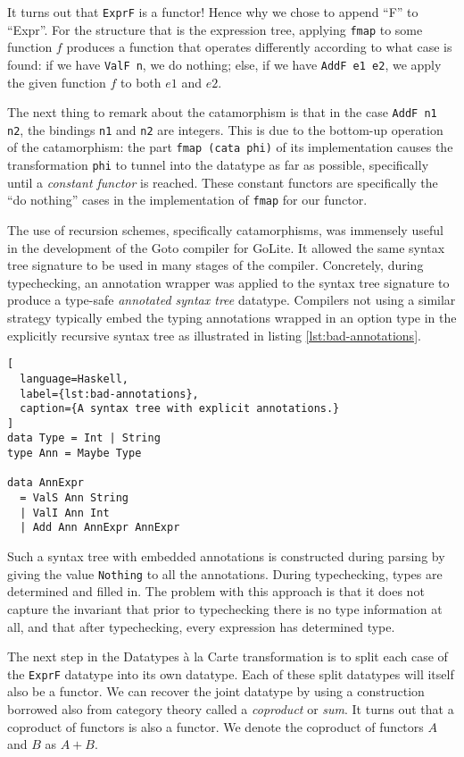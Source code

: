 \documentclass[letterpaper,11pt]{article}
\newcommand{\codesnip}{\texttt}
\begin{document}
It turns out that \codesnip{ExprF} is a functor! Hence why we chose to append
``F'' to ``Expr''. For the structure that is the expression tree, applying
\codesnip{fmap} to some function $f$ produces a function that operates
differently according to what case is found: if we have \codesnip{ValF n}, we
do nothing; else, if we have \codesnip{AddF e1 e2}, we apply the given function
$f$ to both $e1$ and $e2$.

The next thing to remark about the catamorphism is that in the case
\codesnip{AddF n1 n2}, the bindings \codesnip{n1} and \codesnip{n2} are
integers. This is due to the bottom-up operation of the catamorphism: the part
\codesnip{fmap (cata phi)} of its implementation causes the transformation
\codesnip{phi} to tunnel into the datatype as far as possible, specifically
until a \emph{constant functor} is reached. These constant functors are
specifically the ``do nothing'' cases in the implementation of \codesnip{fmap}
for our functor.

The use of recursion schemes, specifically catamorphisms, was immensely useful
in the development of the Goto\cite{Goto} compiler for GoLite. It allowed the
same syntax tree signature to be used in many stages of the compiler.
Concretely, during typechecking, an annotation wrapper was applied to the
syntax tree signature to produce a type-safe \emph{annotated syntax tree}
datatype. Compilers not using a similar strategy typically embed the typing
annotations wrapped in an option type in the explicitly recursive syntax tree
as illustrated in listing \ref{lst:bad-annotations}.

\begin{lstlisting}[
  language=Haskell,
  label={lst:bad-annotations},
  caption={A syntax tree with explicit annotations.}
]
data Type = Int | String
type Ann = Maybe Type

data AnnExpr
  = ValS Ann String
  | ValI Ann Int
  | Add Ann AnnExpr AnnExpr
\end{lstlisting}

Such a syntax tree with embedded annotations is constructed during parsing by
giving the value \codesnip{Nothing} to all the annotations. During
typechecking, types are determined and filled in. The problem with this
approach is that it does not capture the invariant that prior to typechecking
there is no type information at all, and that after typechecking, every
expression has determined type.

The next step in the Datatypes à la Carte transformation is to split each case
of the \codesnip{ExprF} datatype into its own datatype. Each of these split
datatypes will itself also be a functor. We can recover the joint datatype by
using a construction borrowed also from category theory called a
\emph{coproduct} or \emph{sum}. It turns out that a coproduct of functors is
also a functor. We denote the coproduct of functors $A$ and $B$ as $A + B$.
\end{document}
